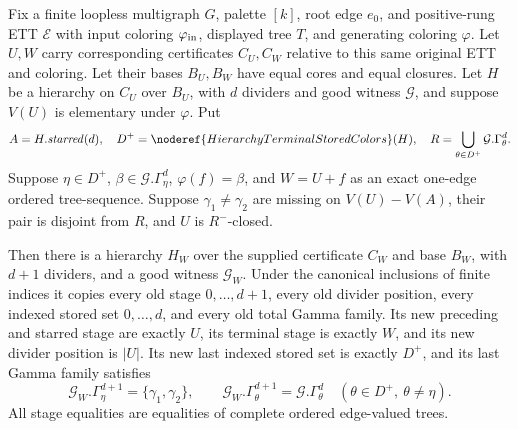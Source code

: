 \begin{lemma}
Fix a finite loopless multigraph $G$, palette $[k]$, root edge $e_0$,
and positive-rung ETT $\mathcal E$ with input coloring $\varphi_{\rm in}$,
displayed tree $T$, and generating coloring $\varphi$.
Let $U,W$ carry corresponding certificates $C_U,C_W$ relative to this
same original ETT and coloring. Let their bases $B_U,B_W$ have equal
cores and equal closures. Let $H$ be a hierarchy on $C_U$ over $B_U$,
with $d$ dividers and good witness $\mathcal G$, and suppose $V(U)$
is elementary under $\varphi$. Put
\[
 A=H.\mathit{starred}(d),\quad
 D^+=\noderef{HierarchyTerminalStoredColors}(H),\quad
 R=\bigcup_{\theta\in D^+}\mathcal G.\Gamma^d_\theta.
\]
Suppose $\eta\in D^+$, $\beta\in\mathcal G.\Gamma^d_\eta$,
$\varphi(f)=\beta$, and $W=U+f$ as an exact one-edge ordered
tree-sequence. Suppose $\gamma_1\ne\gamma_2$ are missing on
$V(U)-V(A)$, their pair is disjoint from $R$, and $U$ is $R^-$-closed.

Then there is a hierarchy $H_W$ over the supplied certificate $C_W$
and base $B_W$, with $d+1$ dividers, and a good witness $\mathcal G_W$.
Under the canonical inclusions of finite indices it copies every old
stage $0,\ldots,d+1$, every old divider position, every indexed stored
set $0,\ldots,d$, and every old total Gamma family. Its new preceding
and starred stage are exactly $U$, its terminal stage is exactly $W$,
and its new divider position is $|U|$. Its new last indexed stored set
is exactly $D^+$, and its last Gamma family satisfies
\[
 \mathcal G_W.\Gamma^{d+1}_\eta=\{\gamma_1,\gamma_2\},\qquad
 \mathcal G_W.\Gamma^{d+1}_\theta=\mathcal G.\Gamma^d_\theta
       \quad(\theta\in D^+,\ \theta\ne\eta).
\]
All stage equalities are equalities of complete ordered edge-valued trees.
\end{lemma}
